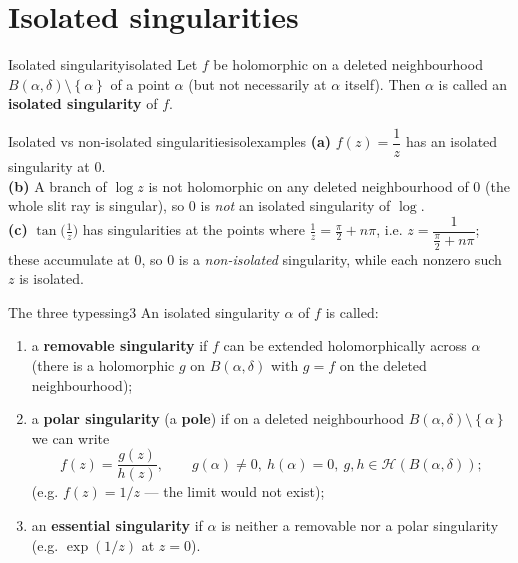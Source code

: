 \documentclass[11pt,openany]{report}
\newcommand{\set}[1]{\left\{ #1 \right\}}
\newcommand{\Hol}{\mathcal{H}}
\begin{document}
\section{Isolated singularities}

\begin{definition}{Isolated singularity}{isolated}
Let $f$ be holomorphic on a deleted neighbourhood $B(\alpha,\delta)\setminus\set{\alpha}$
of a point $\alpha$ (but not necessarily at $\alpha$ itself). Then $\alpha$ is called an
\textbf{isolated singularity} of $f$.
\end{definition}

\begin{example}{Isolated vs non-isolated singularities}{isolexamples}
\textbf{(a)} $f(z)=\dfrac1z$ has an isolated singularity at $0$.\\[3pt]
\textbf{(b)} A branch of $\log z$ is not holomorphic on any deleted neighbourhood of $0$
(the whole slit ray is singular), so $0$ is \emph{not} an isolated singularity of $\log$.
\\[3pt]
\textbf{(c)} $\tan\!\big(\tfrac1z\big)$ has singularities at the points where
$\tfrac1z=\tfrac\pi2+n\pi$, i.e. $z=\dfrac{1}{\frac\pi2+n\pi}$; these accumulate at $0$, so
$0$ is a \emph{non-isolated} singularity, while each nonzero such $z$ is isolated.
\end{example}

\begin{definition}{The three types}{sing3}
An isolated singularity $\alpha$ of $f$ is called:
\begin{enumerate}[label=\textup{(\arabic*)},leftmargin=2em]
  \item a \textbf{removable singularity} if $f$ can be extended holomorphically across
        $\alpha$ (there is a holomorphic $g$ on $B(\alpha,\delta)$ with $g=f$ on the
        deleted neighbourhood);
  \item a \textbf{polar singularity} (a \textbf{pole}) if on a deleted neighbourhood
        $B(\alpha,\delta)\setminus\set{\alpha}$ we can write
        \[
          f(z) = \frac{g(z)}{h(z)}, \qquad g(\alpha)\ne0,\ h(\alpha)=0,\ g,h\in\Hol(B(\alpha,\delta));
        \]
        (e.g. $f(z)=1/z$ --- the limit would not exist);
  \item an \textbf{essential singularity} if $\alpha$ is neither a removable nor a polar
        singularity (e.g. $\exp(1/z)$ at $z=0$).
\end{enumerate}
\end{definition}
\end{document}
